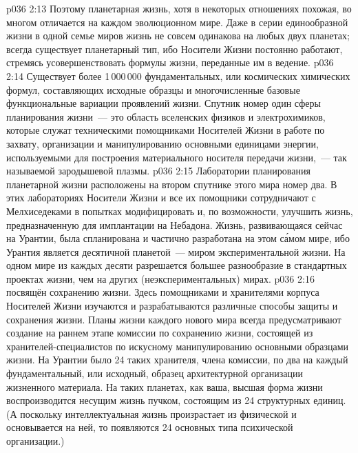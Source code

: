 \vs p036 2:13 Поэтому планетарная жизнь, хотя в некоторых отношениях похожая, во многом отличается на каждом эволюционном мире. Даже в серии единообразной жизни в одной семье миров жизнь не совсем одинакова на любых двух планетах; всегда существует планетарный тип, ибо Носители Жизни постоянно работают, стремясь усовершенствовать формулы жизни, переданные им в ведение.
\vs p036 2:14 Существует более 1\,000\,000 фундаментальных, или космических химических формул, составляющих исходные образцы и многочисленные базовые функциональные вариации проявлений жизни. Спутник номер один сферы планирования жизни~--- это область вселенских физиков и электрохимиков, которые служат техническими помощниками Носителей Жизни в работе по захвату, организации и манипулированию основными единицами энергии, используемыми для построения материального носителя передачи жизни,~--- так называемой зародышевой плазмы.
\vs p036 2:15 Лаборатории планирования планетарной жизни расположены на втором спутнике этого мира номер два. В этих лабораториях Носители Жизни и все их помощники сотрудничают с Мелхиседеками в попытках модифицировать и, по возможности, улучшить жизнь, предназначенную для имплантации на  Небадона. Жизнь, развивающаяся сейчас на Урантии, была спланирована и частично разработана на этом с\'амом мире, ибо Урантия является десятичной планетой~--- миром экспериментальной жизни. На одном мире из каждых десяти разрешается большее разнообразие в стандартных проектах жизни, чем на других (неэкспериментальных) мирах.
\vs p036 2:16 \pc {} посвящён сохранению жизни. Здесь помощниками и хранителями корпуса Носителей Жизни изучаются и разрабатываются различные способы защиты и сохранения жизни. Планы жизни каждого нового мира всегда предусматривают создание на раннем этапе комиссии по сохранению жизни, состоящей из хранителей\hyp{}специалистов по искусному манипулированию основными образцами жизни. На Урантии было 24 таких хранителя, члена комиссии, по два на каждый фундаментальный, или исходный, образец архитектурной организации жизненного материала. На таких планетах, как ваша, высшая форма жизни воспроизводится несущим жизнь пучком, состоящим из 24 структурных единиц. (А поскольку интеллектуальная жизнь произрастает из физической и основывается на ней, то появляются 24 основных типа психической организации.)
